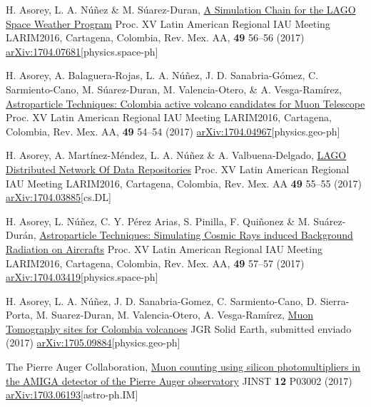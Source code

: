 \begin{etaremune}
\item {} H. Asorey, L. A. Núñez \& M. Súarez-Duran, \href{http://www.astroscu.unam.mx/rmaa/RMxAC..49/PDF/RMxAC..49\_oral6.pdf}{{A Simulation Chain for the LAGO Space Weather Program}} \en Proc. XV Latin American Regional IAU Meeting LARIM2016, Cartagena, Colombia, Rev. Mex. AA, {\bf{49}} 56--56 (2017) \href{http://arxiv.org/abs/1704.07681}{arXiv:1704.07681}[physics.space-ph]

\item {} H. Asorey, A. Balaguera-Rojas, L. A. Núñez, J. D. Sanabria-Gómez, C. Sarmiento-Cano, M. Súarez-Duran, M. Valencia-Otero, \& A. Vesga-Ramírez, \href{http://www.astroscu.unam.mx/rmaa/RMxAC..49/PDF/RMxAC..49\_oral4.pdf}{{Astroparticle Techniques: Colombia active volcano candidates for Muon Telescope}} \en Proc. XV Latin American Regional IAU Meeting LARIM2016, Cartagena, Colombia, Rev. Mex. AA, {\bf{49}} 54--54 (2017) \href{http://arxiv.org/abs/1704.04967}{arXiv:1704.04967}[physics.geo-ph]

\item {}H. Asorey, A. Martínez-Méndez, L. A. Núñez \& A. Valbuena-Delgado, \href{http://www.astroscu.unam.mx/rmaa/RMxAC..49/PDF/RMxAC..49\_oral5.pdf}{{LAGO Distributed Network Of Data Repositories}} \en Proc. XV Latin American Regional IAU Meeting LARIM2016, Cartagena, Colombia, Rev. Mex. AA {\bf{49}} 55--55 (2017) \href{http://arxiv.org/abs/1704.03885}{arXiv:1704.03885}[cs.DL]

\item {}H. Asorey, L. Núñez, C. Y. Pérez Arias, S. Pinilla, F. Quiñonez \& M. Suárez-Durán, \href{http://www.astroscu.unam.mx/rmaa/RMxAC..49/PDF/RMxAC..49\_oral7.pdf}{{Astroparticle Techniques: Simulating Cosmic Rays induced Background Radiation on Aircrafts}} \en Proc. XV Latin American Regional IAU Meeting LARIM2016, Cartagena, Colombia, Rev. Mex. AA, {\bf{49}} 57--57 (2017) \href{http://arxiv.org/abs/1704.03419}{arXiv:1704.03419}[physics.space-ph]

\item {}H. Asorey, L. A. Núñez, J. D. Sanabria-Gomez, C. Sarmiento-Cano, D. Sierra-Porta, M. Suarez-Duran, M. Valencia-Otero, A. Vesga-Ramírez, \href{}{{Muon Tomography sites for Colombia volcanoes}} JGR Solid Earth, \ifeng submitted \else enviado \fi (2017) \href{http://arxiv.org/abs/1705.09884}{arXiv:1705.09884}[physics.geo-ph]
	
\item {}The Pierre Auger Collaboration, \href{https://doi.org/10.1088/1748-0221/12/03/P03002}{{Muon counting using silicon photomultipliers in the AMIGA detector of the Pierre Auger observatory}} JINST {\bf 12} P03002 (2017) \href{http://arxiv.org/abs/1703.06193}{arXiv:1703.06193}[astro-ph.IM]


\end{etaremune}
